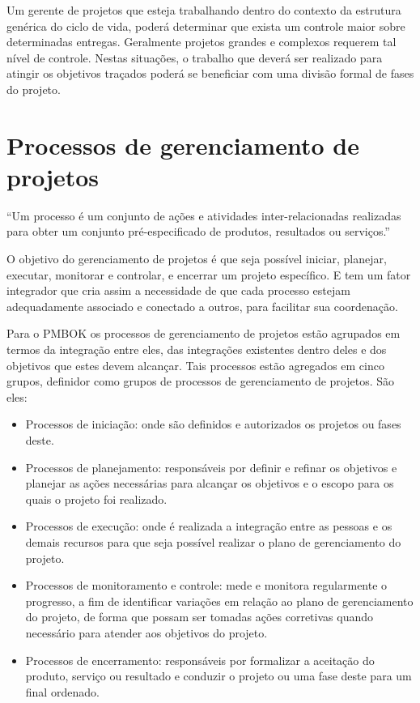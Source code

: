 \documentclass[12pt,a4paper,ruledheader,tocpage=prefix,floatnumber=continuous,pagestart=folhaderosto,font=times]{abnt}
\begin{document}
Um gerente de projetos que esteja trabalhando dentro do contexto da estrutura genérica do ciclo de vida, poderá determinar que exista um controle maior 
sobre determinadas entregas. Geralmente projetos grandes e complexos requerem tal nível de controle. Nestas situações, o trabalho que deverá ser realizado
para atingir os objetivos traçados poderá se beneficiar com uma divisão formal de fases do projeto.  

\section{Processos de gerenciamento de projetos}
“Um processo é um conjunto de ações e atividades inter-relacionadas
realizadas para obter um conjunto pré-especificado de produtos, resultados ou serviços.”\cite{pmbok}

O objetivo do gerenciamento de projetos é que seja possível iniciar, planejar, executar, monitorar e controlar, e encerrar um projeto específico. E tem um
fator integrador que cria assim a necessidade de que cada processo estejam adequadamente associado e conectado a outros, para facilitar sua coordenação.

Para o PMBOK os processos de gerenciamento de projetos estão agrupados em termos da integração entre eles, das integrações existentes dentro deles e dos 
objetivos que estes devem alcançar. Tais processos estão agregados em cinco grupos, definidor como grupos de processos de gerenciamento de projetos. São eles:

\begin{itemize}
 \item Processos de iniciação: onde são definidos e autorizados os projetos ou fases deste.
 \item Processos de planejamento: responsáveis por definir e refinar os objetivos e planejar as ações necessárias para alcançar os objetivos e o escopo para
       os quais o projeto foi realizado.
 \item Processos de execução: onde é realizada a integração entre as pessoas e os demais recursos para que seja possível realizar o plano de gerenciamento do
       projeto.
 \item Processos de monitoramento e controle: mede e monitora regularmente o progresso, a fim de identificar variações em relação ao plano de gerenciamento do
       projeto, de forma que possam ser tomadas ações corretivas quando necessário para atender aos objetivos do projeto.
 \item Processos de encerramento: responsáveis por formalizar a aceitação do produto, serviço ou resultado e conduzir o projeto ou uma fase deste para um final
       ordenado.
\end{itemize}
\end{document}
